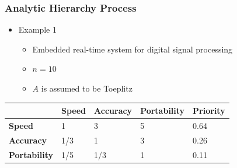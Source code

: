\documentclass[t,12pt,numbers,fleqn]{beamer}
\begin{document}
\begin{frame}

\frametitle{Analytic Hierarchy Process}

\begin{itemize}
\item Example 1
\begin{itemize}
\item Embedded real-time system for digital signal processing
\item $n = 10$
\item $A$ is assumed to be Toeplitz
\end{itemize}
\end{itemize}

\begin{tabular}{| l | l | l | l | l |}
\hline
~ & \textbf{Speed} & \textbf{Accuracy} & \textbf{Portability} & \textbf{Priority}\\
\hline
\textbf{Speed} & 1 & 3 & 5 & 0.64\\
\textbf{Accuracy} & 1/3 & 1 & 3 & 0.26\\
\textbf{Portability} & 1/5 & 1/3 & 1 & 0.11\\
\hline
\end{tabular}

\end{frame}






\end{document}
